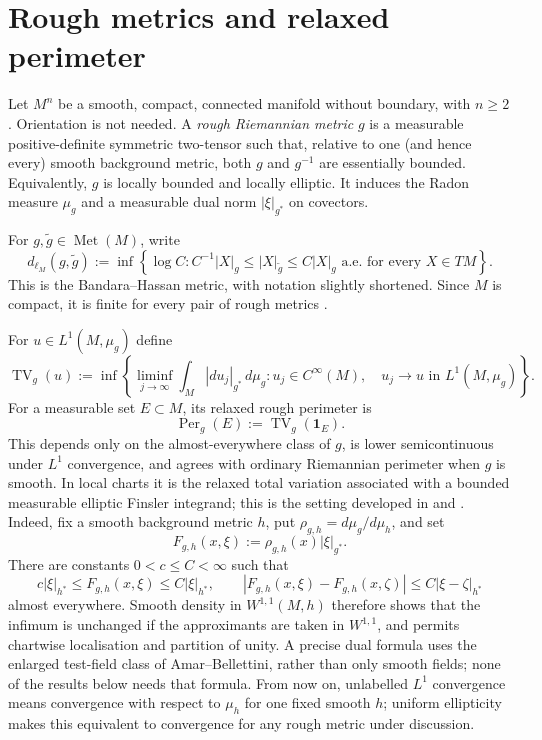 \documentclass[11pt]{amsart}
\theoremstyle{definition}
\theoremstyle{remark}
\newcommand{\Met}{\operatorname{Met}}
\newcommand{\dMet}{d_{\ell_M}}
\newcommand{\TV}{\operatorname{TV}}
\newcommand{\Per}{\operatorname{Per}}
\newcommand{\dmu}[1]{\,d\mu_{#1}}
\newcommand{\one}{\mathbf 1}
\begin{document}
\section{Rough metrics and relaxed perimeter}

Let $M^n$ be a smooth, compact, connected manifold without boundary, with
$n\geq2$.  Orientation is not needed.  A \emph{rough Riemannian metric} $g$ is
a measurable positive-definite symmetric two-tensor such that, relative to
one (and hence every) smooth background metric, both $g$ and $g^{-1}$ are
essentially bounded.  Equivalently, $g$ is locally bounded and locally
elliptic.  It induces the Radon measure $\mu_g$ and a measurable dual norm
$|\xi|_{g^*}$ on covectors.

For $g,\widetilde g\in\Met(M)$, write
\begin{equation}\label{eq:metric-on-metrics}
 \dMet(g,\widetilde g)
 :=\inf\left\{\log C:
 C^{-1}|X|_g\leq |X|_{\widetilde g}\leq C|X|_g
 \text{ a.e. for every }X\in TM\right\}.
\end{equation}
This is the Bandara--Hassan metric, with notation slightly shortened.  Since
$M$ is compact, it is finite for every pair of rough metrics
\cite{BandaraHassan2025}.

For $u\in L^1(M,\mu_g)$ define
\begin{equation}\label{eq:rough-TV}
 \TV_g(u):=\inf\left\{
 \liminf_{j\to\infty}\int_M |du_j|_{g^*}\dmu g:
 u_j\in C^\infty(M),\quad u_j\to u\text{ in }L^1(M,\mu_g)
 \right\}.
\end{equation}
For a measurable set $E\subset M$, its relaxed rough perimeter is
\begin{equation}\label{eq:rough-perimeter}
 \Per_g(E):=\TV_g(\one_E).
\end{equation}
This depends only on the almost-everywhere class of $g$, is lower
semicontinuous under $L^1$ convergence, and agrees with ordinary Riemannian
perimeter when $g$ is smooth.  In local charts it is the relaxed total
variation associated with a bounded measurable elliptic Finsler integrand;
this is the setting developed in
\cite[Theorem~5.1]{AmarBellettini1994} and
\cite{BellettiniBouchitteFragala1999}.  Indeed, fix a smooth background metric
$h$, put $\rho_{g,h}=d\mu_g/d\mu_h$, and set
\[
 F_{g,h}(x,\xi):=\rho_{g,h}(x)|\xi|_{g^*}.
\]
There are constants $0<c\leq C<\infty$ such that
\[
 c|\xi|_{h^*}\leq F_{g,h}(x,\xi)\leq C|\xi|_{h^*},
 \qquad
 |F_{g,h}(x,\xi)-F_{g,h}(x,\zeta)|
 \leq C|\xi-\zeta|_{h^*}
\]
almost everywhere.  Smooth density in $W^{1,1}(M,h)$ therefore shows that the
infimum is unchanged if the approximants are taken in $W^{1,1}$, and permits
chartwise localisation and partition of unity.  A precise dual formula uses
the enlarged test-field class of Amar--Bellettini, rather than only smooth
fields; none of the results below needs that formula.  From now on, unlabelled
$L^1$ convergence means convergence with respect to $\mu_h$ for one fixed
smooth $h$; uniform ellipticity makes this equivalent to convergence for any
rough metric under discussion.
\end{document}
